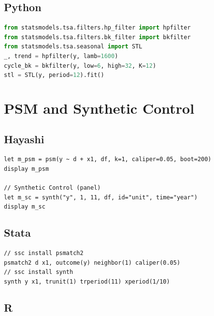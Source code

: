 \subsection*{Python}

\begin{lstlisting}[language=Python, basicstyle=\ttfamily\small,
  frame=single, numbers=none, backgroundcolor=\color{codbg},
  keywordstyle=\color{keyword}\bfseries,
  stringstyle=\color{string},
  commentstyle=\color{comment}\itshape]
from statsmodels.tsa.filters.hp_filter import hpfilter
from statsmodels.tsa.filters.bk_filter import bkfilter
from statsmodels.tsa.seasonal import STL
_, trend = hpfilter(y, lamb=1600)
cycle_bk = bkfilter(y, low=6, high=32, K=12)
stl = STL(y, period=12).fit()
\end{lstlisting}

\section{PSM and Synthetic Control}

\subsection*{Hayashi}

\begin{lstlisting}
let m_psm = psm(y ~ d + x1, df, k=1, caliper=0.05, boot=200)
display m_psm

// Synthetic Control (panel)
let m_sc = synth("y", 1, 11, df, id="unit", time="year")
display m_sc
\end{lstlisting}

\subsection*{Stata}

\begin{lstlisting}[language={}, basicstyle=\ttfamily\small,
  frame=single, numbers=none, backgroundcolor=\color{codbg}]
// ssc install psmatch2
psmatch2 d x1, outcome(y) neighbor(1) caliper(0.05)
// ssc install synth
synth y x1, trunit(1) trperiod(11) xperiod(1/10)
\end{lstlisting}

\subsection*{R}

